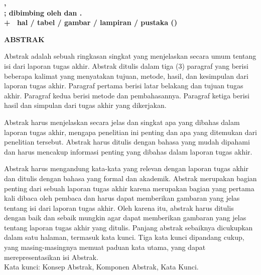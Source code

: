 
\clearpage
{}
{}
\noindent\textbf{\penulis, \nim}\\
\textbf{\MakeUppercase{\judulid}; dibimbing oleh {\pembimbingutama} dan {\pembimbingpendamping}.}\\
\textbf{\pageref{LastPage} + \getromanpagelast\ hal /  tabel /  gambar /  lampiran /  pustaka (\the\year)}
\begin{center}
    \textbf{ABSTRAK}\\[0.5cm]
\end{center}

Abstrak adalah sebuah ringkasan singkat yang menjelaskan secara umum tentang isi dari laporan tugas akhir. Abstrak ditulis dalam tiga (3) paragraf yang berisi beberapa kalimat yang menyatakan tujuan, metode, hasil, dan kesimpulan dari laporan tugas akhir. Paragraf pertama berisi latar belakang dan tujuan tugas akhir. Paragraf kedua berisi metode dan pembahasannya. Paragraf ketiga berisi hasil dan simpulan dari tugas akhir yang dikerjakan.

Abstrak harus menjelaskan secara jelas dan singkat apa yang dibahas dalam laporan tugas akhir, mengapa penelitian ini penting dan apa yang ditemukan dari penelitian tersebut. Abstrak harus ditulis dengan bahasa yang mudah dipahami dan harus mencakup informasi penting yang dibahas dalam laporan tugas akhir. 

Abstrak harus mengandung kata-kata yang relevan dengan laporan tugas akhir dan ditulis dengan bahasa yang formal dan akademik. Abstrak merupakan bagian penting dari sebuah laporan tugas akhir karena merupakan bagian yang pertama kali dibaca oleh pembaca dan harus dapat memberikan gambaran yang jelas tentang isi dari laporan tugas akhir. Oleh karena itu, abstrak harus ditulis dengan baik dan sebaik mungkin agar dapat memberikan gambaran yang jelas tentang laporan tugas akhir yang ditulis. Panjang abstrak sebaiknya dicukupkan dalam satu halaman, termasuk kata kunci. Tiga kata kunci dipandang cukup, yang masing-masingnya memuat paduan kata utama, yang dapat merepresentasikan isi Abstrak.\\[0.6cm]

\noindent Kata kunci: Konsep Abstrak, Komponen Abstrak, Kata Kunci.
